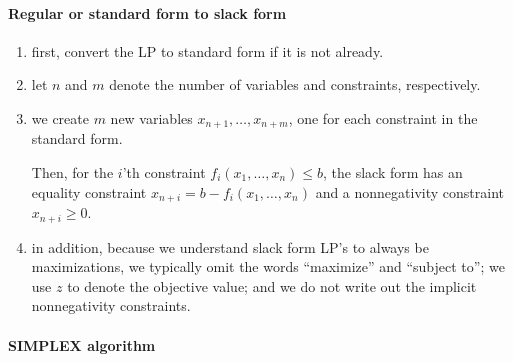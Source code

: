 \paragraph{Regular or standard form to slack form}
\label{sec:to_slack_form}

\begin{enumerate}
\item first, convert the LP to standard form if it is not already.

\item let $n$ and $m$ denote the number of variables and constraints, respectively.

\item we create $m$ new variables $x_{n + 1}, \dots, x_{n + m}$, one for each
  constraint in the standard form.

  Then, for the $i$'th constraint $f_i(x_1, \dots, x_n) \leq b$, the slack form
    has an equality constraint $x_{n + i} = b - f_i(x_1, \dots, x_n)$ and a
    nonnegativity constraint $x_{n + i} \geq 0$.

\item in addition, because we understand slack form LP's to always be
  maximizations, we typically omit the words ``maximize'' and ``subject to''; we
    use $z$ to denote the objective value; and we do not write out the implicit
    nonnegativity constraints.

\end{enumerate}

\paragraph{SIMPLEX algorithm}
\label{sec:simplex}

